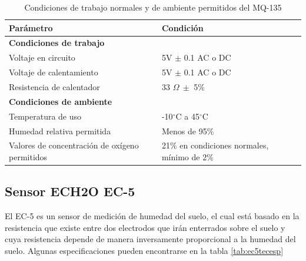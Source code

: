 \documentclass[../main]{subfiles}
\begin{document}
\begin{table}[H]
	\centering
	\begin{tabular}{m{6cm} m{6cm}}
		\toprule
		Parámetro                                      & Condición                                   \\
		\midrule
		\textbf{Condiciones de trabajo}                &                                             \\
		Voltaje en circuito                            & 5V $\pm$ 0.1 AC o DC                        \\
		Voltaje de calentamiento                       & 5V $\pm$ 0.1 AC o DC                        \\
		Resistencia de calentador                      & 33 $\Omega \ \pm$ 5\%                       \\
		\midrule
		\textbf{Condiciones de ambiente}               &                                             \\
		Temperatura de uso                             & -10$^{\circ}$C a 45$^{\circ}$C              \\
		Humedad relativa permitida                     & Menos de 95\%                               \\
		Valores de concentración de oxígeno permitidos & 21\% en condiciones normales, mínimo de 2\% \\
		\bottomrule
	\end{tabular}
	\caption{Condiciones de trabajo normales y de ambiente permitidos del MQ-135\cite{mq135hanwei}}
	\label{tab:mq135conditions}
\end{table}

\subsection{Sensor ECH2O EC-5}

El EC-5 es un sensor de medición de humedad del suelo, el cual está basado en la
resistencia que existe entre dos electrodos que irán enterrados sobre el suelo y
cuya resistencia depende de manera inversamente proporcional a la humedad del
suelo\cite{ec5humedadsuelosensor}.
Algunas especificaciones pueden encontrarse en la tabla \ref{tab:ec5tecesp}
\end{document}
